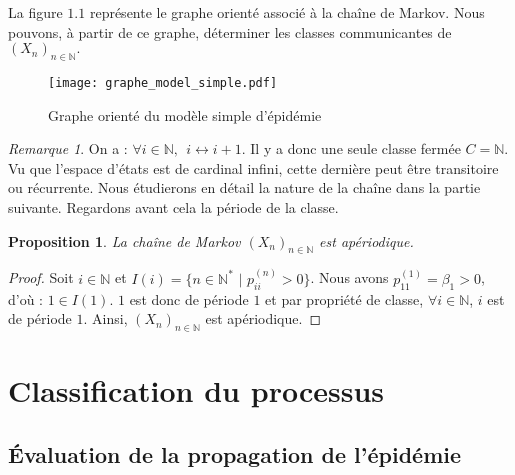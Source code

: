 \documentclass[12pt,a4paper]{report}
\newtheorem{prop}[thm]{Proposition}
\theoremstyle{remark}
\newtheorem*{remark}{Remarque}
\begin{document}
La figure $1.1$ représente le graphe orienté associé à la chaîne de Markov. Nous pouvons, à partir de ce graphe, déterminer les classes communicantes de $(X_n)_{n \in \mathbb{N}}.$

\begin{figure}[h]
    \centering
    \texttt{[image: graphe\_model\_simple.pdf]} 
    \caption{Graphe orienté du modèle simple d'épidémie}
    \label{fig:my_label}
\end{figure}

\begin{remark}
On a : $\forall i \in \mathbb{N},\ \  i \longleftrightarrow i+1$.
Il y a donc une seule classe fermée $C=\mathbb{N}$. Vu que l'espace d'états est de cardinal infini, cette dernière peut être transitoire ou récurrente. Nous étudierons en détail la nature de la chaîne dans la partie suivante. Regardons avant cela la période de la classe.
\end{remark}

\begin{prop}\label{aperiodique}
La chaîne de Markov $(X_n)_{n \in \mathbb{N}}$ est apériodique.
\end{prop}
\begin{proof}
Soit $i \in \mathbb{N}$ et $I(i) = \{n \in \mathbb{N}^* \, \, | \, \,p_{ii}^{(n)} > 0\}$. Nous avons $p_{11}^{(1)} = \beta_1 > 0$, d'où : $1 \in I(1)$. $1$ est donc de période $1$ et par propriété de classe, $\forall i \in \mathbb{N}$, $i$ est de période $1$. Ainsi, $(X_n)_{n \in \mathbb{N}}$ est apériodique.
\end{proof}

\section{Classification du processus}

\subsection{Évaluation de la propagation de l'épidémie}
\vspace{0.6cm}
\end{document}

